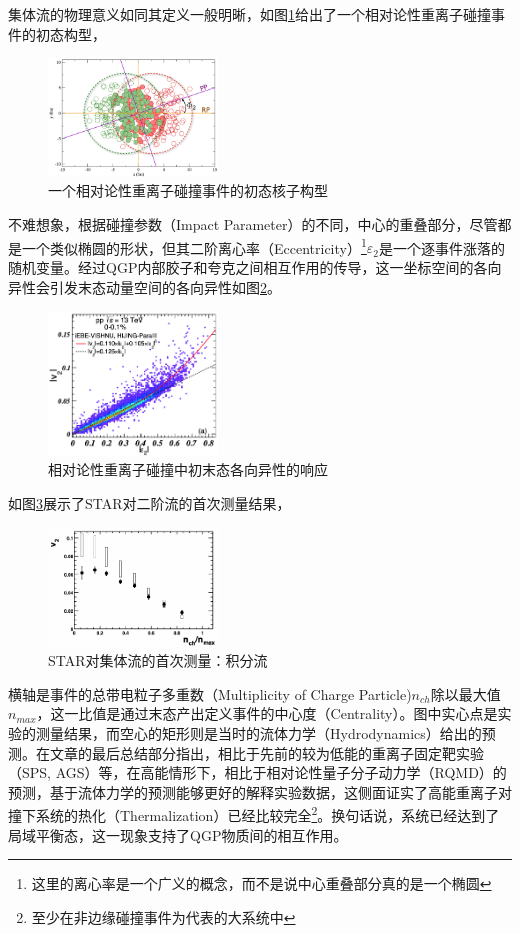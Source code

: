 \documentclass[%
 reprint,
 amsmath,amssymb,
 aps,
]{revtex4-1}
\begin{document}
集体流的物理意义如同其定义一般明晰，如图\ref{fig:Config}\cite{Qiu:2013wca}给出了一个相对论性重离子碰撞事件的初态构型，
\begin{figure}[htbp]
    \includegraphics[width=0.4\textwidth]{Plots/Config.png}
    \caption{\label{fig:Config}一个相对论性重离子碰撞事件的初态核子构型}
\end{figure}
不难想象，根据碰撞参数（Impact Parameter）的不同，中心的重叠部分，尽管都是一个类似椭圆的形状，但其二阶离心率（Eccentricity）\footnote{这里的离心率是一个广义的概念，而不是说中心重叠部分真的是一个椭圆}$\varepsilon_2$是一个逐事件涨落的随机变量。经过QGP内部胶子和夸克之间相互作用的传导，这一坐标空间的各向异性会引发末态动量空间的各向异性如图\ref{fig:v2e2}\cite{Zhou:2020pai}。
\begin{figure}[htbp]
    \includegraphics[width=0.4\textwidth]{Plots/v2e2.png}
    \caption{\label{fig:v2e2}相对论性重离子碰撞中初末态各向异性的响应}
\end{figure}

如图\ref{fig:v2}展示了STAR对二阶流的首次测量结果\cite{Ackermann:2000tr}，
\begin{figure}[htbp]
    \includegraphics[width=0.4\textwidth]{Plots/v2.png}
    \caption{\label{fig:v2}STAR对集体流的首次测量：积分流}
\end{figure}
横轴是事件的总带电粒子多重数（Multiplicity of Charge Particle)$n_{ch}$除以最大值$n_{max}$，这一比值是通过末态产出定义事件的中心度（Centrality）。图中实心点是实验的测量结果，而空心的矩形则是当时的流体力学（Hydrodynamics）给出的预测。在文章的最后总结部分指出，相比于先前的较为低能的重离子固定靶实验（SPS, AGS）等，在高能情形下，相比于相对论性量子分子动力学（RQMD）的预测，基于流体力学的预测能够更好的解释实验数据，这侧面证实了高能重离子对撞下系统的热化（Thermalization）已经比较完全\footnote{至少在非边缘碰撞事件为代表的大系统中}。换句话说，系统已经达到了局域平衡态，这一现象支持了QGP物质间的相互作用。
\end{document}
